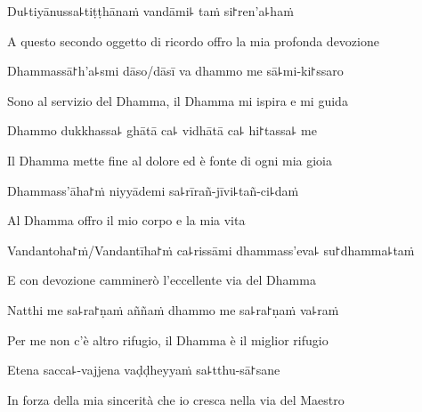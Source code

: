 Du꜕tiyānussa꜕tiṭṭhānaṁ vandāmi꜕ taṁ si꜓ren'a꜕haṁ\\

\begin{english}
A questo secondo oggetto di ricordo offro la mia profonda devozione\\
\end{english}

Dhammassā꜓h'a꜕smi dāso/dāsī va dhammo me sā꜕mi-ki꜓ssaro\\

\begin{english}
Sono al servizio del Dhamma, il Dhamma mi ispira e mi guida\\
\end{english}

Dhammo dukkhassa꜕ ghātā ca꜕ vidhātā ca꜕ hi꜓tassa꜕ me\\

\begin{english}
Il Dhamma mette fine al dolore ed è fonte di ogni mia gioia\\
\end{english}

Dhammass'āha꜓ṁ niyyādemi sa꜕rīrañ-jīvi꜕tañ-ci꜕daṁ\\

\begin{english}
Al Dhamma offro il mio corpo e la mia vita\\
\end{english}

Vandantoha꜓ṁ/Vandantīha꜓ṁ ca꜕rissāmi dhammass'eva꜕ su꜓dhamma꜕taṁ\\

\begin{english}
E con devozione camminerò l'eccellente via del Dhamma\\
\end{english}

Natthi me sa꜕ra꜓ṇaṁ aññaṁ dhammo me sa꜕ra꜓ṇaṁ va꜕raṁ\\

\begin{english}
Per me non c'è altro rifugio, il Dhamma è il miglior rifugio\\
\end{english}

Etena sacca꜕-vajjena vaḍḍheyyaṁ sa꜕tthu-sā꜓sane\\

\begin{english}
In forza della mia sincerità che io cresca nella via del Maestro\\
\end{english}

